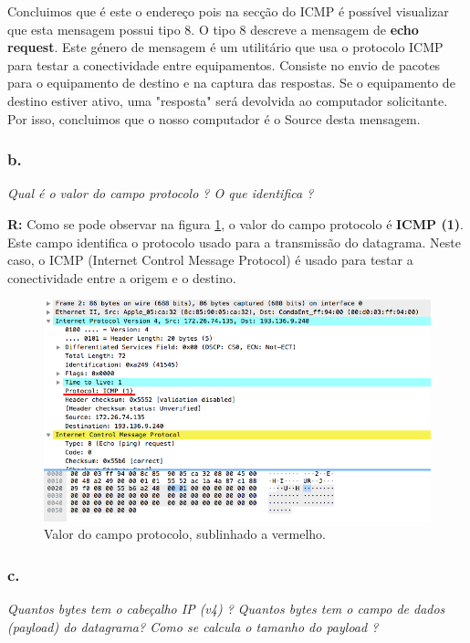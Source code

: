 \documentclass{llncs}
\begin{document}
Concluimos que é este o endereço pois na secção do ICMP é possível visualizar que esta mensagem possui tipo 8. O tipo 8 descreve a mensagem de \textbf{echo request}. Este género de mensagem é um utilitário que usa o protocolo ICMP para testar a conectividade entre equipamentos. Consiste no envio de pacotes para o equipamento de destino e na captura das respostas. Se o equipamento de destino estiver ativo, uma "resposta" será devolvida ao computador solicitante. Por isso, concluimos que o nosso computador é o Source desta mensagem.

\subsubsection{b.}
\emph{Qual é o valor do 
campo 
protocolo
? O
que identifica
?}

\textbf{R:} Como se pode observar na figura \ref{fig:2_b}, o valor do campo protocolo é \textbf{ICMP (1)}. Este campo identifica o protocolo usado para a transmissão do datagrama. Neste caso, o ICMP (Internet Control Message Protocol) é usado para testar a conectividade entre a origem e o destino.

\begin{figure}[H]
\begin{center}
\includegraphics[scale=0.45]{2_b.png} 
\end{center}
\caption{\label{fig:2_b}Valor do campo protocolo, sublinhado a vermelho.}
\end{figure}

\subsubsection{c.}
\emph{Quantos bytes
tem o cabeçalho IP
(v4)
? Quantos 
bytes
tem o
campo de 
dados
(payload) 
do datagrama? 
Como 
se 
calcula
o tamanho do 
payload
?}
\end{document}
